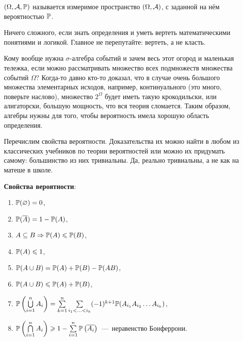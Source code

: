 \documentclass[../TV&MS.tex]{subfiles}
\begin{document}
\begin{Def}
	 $(\Omega, \mathcal{A}, \mathbb{P})$ называется измеримое 
	пространство $(\Omega, \mathcal{A})$, с заданной на нём вероятностью $\mathbb{P}$.
\end{Def}
	
Ничего сложного, если знать определения и уметь вертеть математическими понятиями и логикой.
Главное не перепутайте: вертеть, а не класть.

\begin{Wtf}
	Кому вообще нужна $\sigma$-алгебра событий и зачем весь этот огород и маленькая тележка, если можно 
	рассматривать множество всех подмножеств множества событий $\Omega$? 
	Когда-то давно кто-то 
	доказал, что в случае очень большого множества элементарных исходов, например, 
	континуального (это много, поверьте наслово), множество $2^{\Omega}$ будет иметь такую 
	крокодильски, или алигаторски, большую мощность, что вся теория сломается. Таким образом, 
	алгебры нужны для того, чтобы вероятность имела хорошую область определения.
\end{Wtf}

	Перечислим свойства вероятности. Доказательства их можно найти в любом из
	классических учебников по теории вероятностей или можно их придумать самому:
	большинство из них тривиальны. Да, реально тривиальны, а не как на матеше в 
	школе.

\textbf{Свойства вероятности}:
\begin{enumerate}
	\item $\mathbb{P} (\varnothing) = 0$, 
	\item $\mathbb{P} (\overline{A}) = 1 - \mathbb{P} (A)$,
	\item $A \subseteq B \Rightarrow \mathbb{P} (A) \leqslant \mathbb{P} (B)$,
	\item $\mathbb{P} (A) \leqslant 1$,
	\item $\mathbb{P} (A \cup B) = \mathbb{P} (A) + \mathbb{P} (B) - \mathbb{P} (AB)$, 
	\item $\mathbb{P} (A \cup B) \leqslant \mathbb{P} (A) + \mathbb{P} (B)$,
	\item $\mathbb{P} \left(\bigcup\limits_{i=1}^{n} A_i\right) = 
	\sum\limits_{k=1}^{n} \sum\limits_{i_1<\ldots <i_k} (-1)^{k+1} 
	\mathbb{P}(A_{i_1}A_{i_2}\ldots A_{i_k})$,
	\item $\mathbb{P} \left(\bigcap\limits_{i=1}^{n} A_i\right) \geqslant 1 - 
	\sum\limits_{i=1}^{n} \mathbb{P} \left(\overline{A_i}\right)$~---~неравенство Бонферрони.
\end{enumerate}
\end{document}
